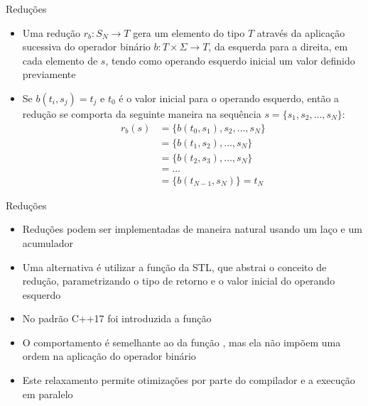 \begin{frame}[fragile]{Reduções}

    \begin{itemize}
        \item Uma redução $r_b : S_N \to T$ gera um elemento do tipo $T$ através da aplicação 
            sucessiva do operador binário $b: T\times \Sigma \to T$, da esquerda para a direita, em cada elemento de $s$, 
            tendo como operando esquerdo inicial um valor definido previamente
        \pause

        \item Se $b(t_i, s_j) = t_j$ e $t_0$ é o valor inicial para o operando esquerdo, 
            então a redução se comporta da seguinte maneira na sequência $s = \lbrace s_1, s_2,
                \ldots, s_N\rbrace$:
        \begin{align*}
            r_b(s) &= \lbrace b(t_0, s_1), s_2, \ldots, s_N\rbrace \\ 
            &= \lbrace b(t_1, s_2), \ldots, s_N\rbrace \\
            &= \lbrace b(t_2, s_3), \ldots, s_N\rbrace \\
            &= \ldots \\
            &= \lbrace b(t_{N-1}, s_N) \rbrace = t_N
        \end{align*}

    \end{itemize}

\end{frame}

\begin{frame}[fragile]{Reduções}

    \begin{itemize}
        \item Reduções podem ser implementadas de maneira natural usando um laço e um 
            acumulador
        \pause

        \item Uma alternativa é utilizar a função  da STL, que
            abstrai o conceito de redução, parametrizando o tipo de retorno e o valor
            inicial do operando esquerdo
        \pause

        \item No padrão C++17 foi introduzida a função 
        \pause

        \item O comportamento é semelhante ao da função , mas ela
            não impõem uma ordem na aplicação do operador binário
        \pause

        \item Este relaxamento permite otimizações por parte do compilador e a execução
            em paralelo
    \end{itemize}

\end{frame}

